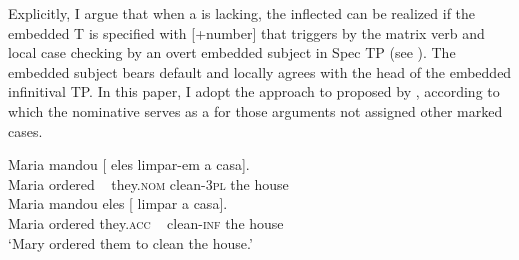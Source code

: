 \documentclass[output=paper]{langsci/langscibook}
\begin{document}
Explicitly, I argue that when a  is lacking, the inflected  can be realized if the embedded T is specified with [+number] that triggers  by the matrix verb and local case checking by an overt embedded subject in Spec TP (see \citealt{Raposo1987}). The embedded subject bears default  and locally agrees with the head of the embedded infinitival TP. In this paper, I adopt the approach to  proposed by \citet{McFadden2011}, according to which the nominative serves as a  for those arguments not assigned other marked cases.

\ea%
    \label{ex:moreno:28}
    \ea
    \gll Maria mandou [ eles          limpar-em   a     casa].    \\
         Maria ordered  ~ they.\textsc{nom}   clean-\textsc{3pl}     the house\\
    \ex  
    \gll Maria mandou   eles [  limpar      a    casa]. \\
         Maria ordered   they.\textsc{acc}  ~ clean-\textsc{inf} the house \\
    \glt ‘Mary ordered them to clean the house.’
    \z
\z
\end{document}
